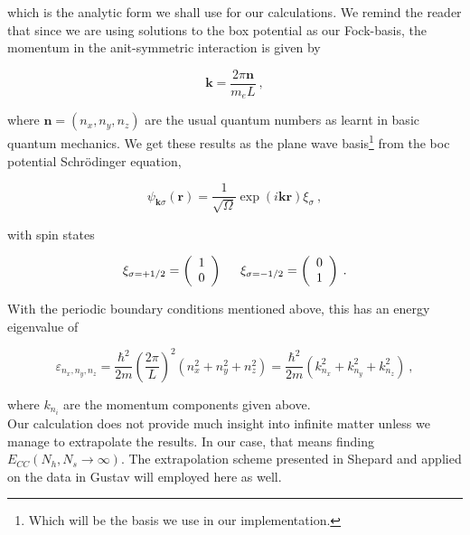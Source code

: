 \documentclass[10pt,twoside]{report}
\begin{document}
	\noindent which is the analytic form we shall use for our calculations. We remind the reader that since we are using solutions to the box potential as our Fock-basis, the momentum in the anit-symmetric interaction is given by
	
	\begin{equation}
		\bm{k} = \frac{2\pi \bm{n}}{m_eL}\:,
	\end{equation}
	
	\noindent where $\bm{n}=(n_x,n_y,n_z)$ are the usual quantum numbers as learnt in basic quantum mechanics. We get these results as the plane wave basis\footnote{Which will be the basis we use in our implementation.} from the boc potential Schr\"odinger equation,
	
	\begin{equation}
		\psi_{\mathbf{k}\sigma}(\mathbf{r})=
		\frac{1}{\sqrt{\Omega}}\exp{(i\mathbf{kr})}\xi_{\sigma}\:,
	\end{equation}
	
	\noindent with spin states
	
	\begin{equation}
		\xi_{\sigma=+1/2}=\left(\begin{array}{c} 1
		\\ 0 \end{array}\right) \hspace{0.5cm}
		\xi_{\sigma=-1/2}=\left(\begin{array}{c} 0 \\ 1 \end{array}\right)\:.
	\end{equation}
	
	With the periodic boundary conditions mentioned above, this has an energy eigenvalue of
	
	\begin{equation}
		\varepsilon_{n_{x}, n_{y}, n_{z}} = \frac{\hbar^{2}}{2m} \left(
		\frac{2\pi }{L}\right)^{2} \left( n_{x}^{2} + n_{y}^{2} +
		n_{z}^{2}\right)=\frac{\hbar^2}{2m}\left(k_{n_x}^2+k_{n_y}^2+k_{n_z}^2\right)\:,
	\end{equation}
	
	\noindent where $k_{n_i}$ are the momentum components given above.\\
	
	Our calculation does not provide much insight into infinite matter unless we manage to extrapolate the results. In our case, that means finding $E_{CC}(N_h,N_s\rightarrow\infty)$. The extrapolation scheme presented in Shepard and applied on the data in Gustav will employed here as well.\\
	
\end{document}
